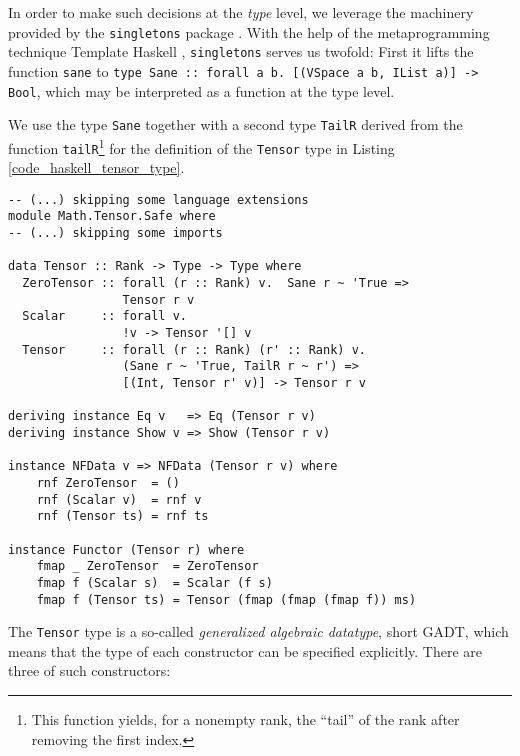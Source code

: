 In order to make such decisions at the \emph{type} level, we leverage the machinery provided by the \texttt{singletons} package \cite{Eisenberg_2012}. With the help of the metaprogramming technique Template Haskell \cite{Sheard_2002}, \texttt{singletons} serves us twofold: First it lifts the function \texttt{sane} to \texttt{type Sane :: forall a b. [(VSpace a b, IList a)] -> Bool}, which may be interpreted as a function at the type level.

We use the type \texttt{Sane} together with a second type \texttt{TailR} derived from the function \texttt{tailR}\footnote{This function yields, for a nonempty rank, the ``tail'' of the rank after removing the first index.} for the definition of the \texttt{Tensor} type in Listing \ref{code_haskell_tensor_type}.
\begin{code}
  \begin{verbatim}
-- (...) skipping some language extensions
module Math.Tensor.Safe where
-- (...) skipping some imports

data Tensor :: Rank -> Type -> Type where
  ZeroTensor :: forall (r :: Rank) v.  Sane r ~ 'True =>
                Tensor r v
  Scalar     :: forall v.
                !v -> Tensor '[] v
  Tensor     :: forall (r :: Rank) (r' :: Rank) v.
                (Sane r ~ 'True, TailR r ~ r') =>
                [(Int, Tensor r' v)] -> Tensor r v

deriving instance Eq v   => Eq (Tensor r v)
deriving instance Show v => Show (Tensor r v)

instance NFData v => NFData (Tensor r v) where
    rnf ZeroTensor  = ()
    rnf (Scalar v)  = rnf v
    rnf (Tensor ts) = rnf ts

instance Functor (Tensor r) where
    fmap _ ZeroTensor  = ZeroTensor
    fmap f (Scalar s)  = Scalar (f s)
    fmap f (Tensor ts) = Tensor (fmap (fmap (fmap f)) ms)
  \end{verbatim}
  \label{code_haskell_tensor_type}
\end{code}
The \texttt{Tensor} type is a so-called \emph{generalized algebraic datatype}, short GADT, which means that the type of each constructor can be specified explicitly. There are three of such constructors:
